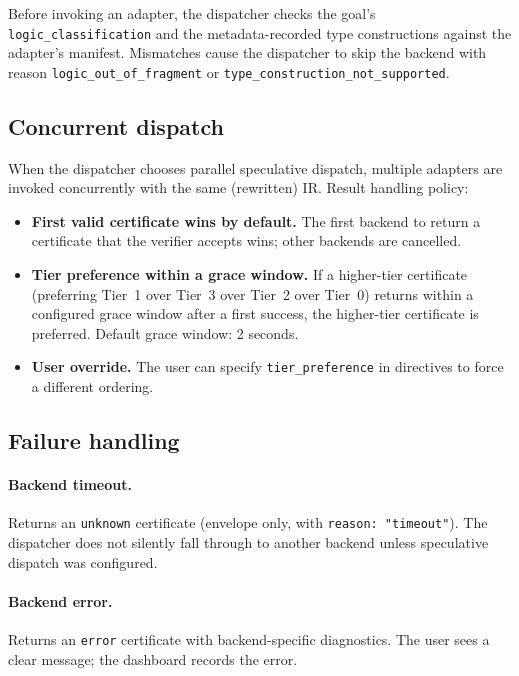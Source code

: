 \documentclass[11pt,letterpaper]{article}
\theoremstyle{definition}
\theoremstyle{remark}
\begin{document}
Before invoking an adapter, the dispatcher checks the goal's
\texttt{logic\_classification} and the metadata-recorded type
constructions against the adapter's manifest. Mismatches cause the
dispatcher to skip the backend with reason
\texttt{logic\_out\_of\_fragment} or \texttt{type\_construction\_not\_supported}.

\subsection{Concurrent dispatch}

When the dispatcher chooses parallel speculative dispatch, multiple
adapters are invoked concurrently with the same (rewritten) IR. Result
handling policy:

\begin{itemize}[leftmargin=2em]
  \item \textbf{First valid certificate wins by default.} The first
        backend to return a certificate that the verifier accepts wins;
        other backends are cancelled.
  \item \textbf{Tier preference within a grace window.} If a higher-tier
        certificate (preferring Tier~1 over Tier~3 over Tier~2 over
        Tier~0) returns within a configured grace window after a
        first success, the higher-tier certificate is preferred.
        Default grace window: 2 seconds.
  \item \textbf{User override.} The user can specify
        \texttt{tier\_preference} in directives to force a different
        ordering.
\end{itemize}

\subsection{Failure handling}

\paragraph{Backend timeout.} Returns an \texttt{unknown} certificate
(envelope only, with \texttt{reason: "timeout"}). The dispatcher does
not silently fall through to another backend unless speculative dispatch
was configured.

\paragraph{Backend error.} Returns an \texttt{error} certificate with
backend-specific diagnostics. The user sees a clear message; the
dashboard records the error.
\end{document}
